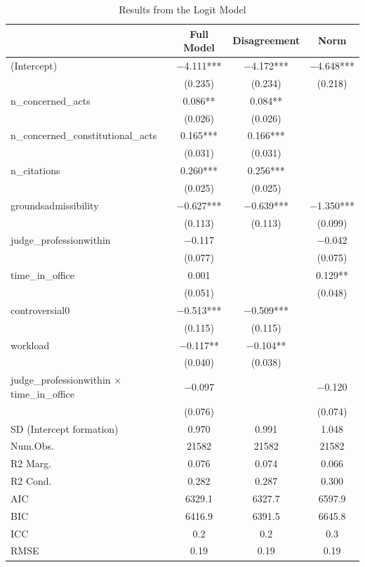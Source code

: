 \documentclass[
  11pt,
]{article}
\begin{document}
\begin{table}
\centering
\caption{\label{tab:unnamed-chunk-3}Results from the Logit Model}
\centering
\begin{tabular}[t]{lccc}
\toprule
  & Full Model & Disagreement & Norm\\
\midrule
(Intercept) & \num{-4.111}*** & \num{-4.172}*** & \num{-4.648}***\\
 & (\num{0.235}) & (\num{0.234}) & (\num{0.218})\\
n\_concerned\_acts & \num{0.086}** & \num{0.084}** & \\
 & (\num{0.026}) & (\num{0.026}) & \\
n\_concerned\_constitutional\_acts & \num{0.165}*** & \num{0.166}*** & \\
 & (\num{0.031}) & (\num{0.031}) & \\
n\_citations & \num{0.260}*** & \num{0.256}*** & \\
 & (\num{0.025}) & (\num{0.025}) & \\
groundsadmissibility & \num{-0.627}*** & \num{-0.639}*** & \num{-1.350}***\\
 & (\num{0.113}) & (\num{0.113}) & (\num{0.099})\\
judge\_professionwithin & \num{-0.117} &  & \num{-0.042}\\
 & (\num{0.077}) &  & (\num{0.075})\\
time\_in\_office & \num{0.001} &  & \num{0.129}**\\
 & (\num{0.051}) &  & (\num{0.048})\\
controversial0 & \num{-0.513}*** & \num{-0.509}*** & \\
 & (\num{0.115}) & (\num{0.115}) & \\
workload & \num{-0.117}** & \num{-0.104}** & \\
 & (\num{0.040}) & (\num{0.038}) & \\
judge\_professionwithin × time\_in\_office & \num{-0.097} &  & \num{-0.120}\\
 & (\num{0.076}) &  & (\num{0.074})\\
SD (Intercept formation) & \num{0.970} & \num{0.991} & \num{1.048}\\
\midrule
Num.Obs. & \num{21582} & \num{21582} & \num{21582}\\
R2 Marg. & \num{0.076} & \num{0.074} & \num{0.066}\\
R2 Cond. & \num{0.282} & \num{0.287} & \num{0.300}\\
AIC & \num{6329.1} & \num{6327.7} & \num{6597.9}\\
BIC & \num{6416.9} & \num{6391.5} & \num{6645.8}\\
ICC & \num{0.2} & \num{0.2} & \num{0.3}\\
RMSE & \num{0.19} & \num{0.19} & \num{0.19}\\
\bottomrule
\end{tabular}
\end{table}
\end{document}
